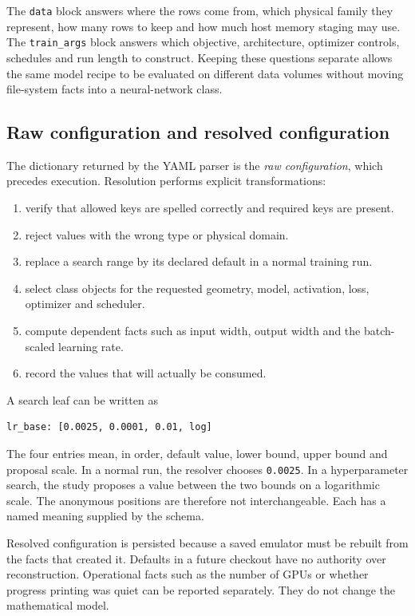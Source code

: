\documentclass[10pt,aps,prd,twocolumn,nofootinbib]{revtex4-2}
\newcommand{\code}[1]{\texttt{#1}}
\begin{document}
The \code{data} block answers where the rows come from, which physical family
they represent, how many rows to keep and how much host memory staging may
use.  The \code{train\_args} block answers which objective, architecture,
optimizer controls, schedules and run length to construct.  Keeping these
questions separate allows the same model recipe to be evaluated on different
data volumes without moving file-system facts into a neural-network class.

\subsection{Raw configuration and resolved configuration}

The dictionary returned by the YAML parser is the \emph{raw configuration},
which precedes execution.  Resolution performs explicit transformations:
\begin{enumerate}
  \item verify that allowed keys are spelled correctly and required keys are
        present.
  \item reject values with the wrong type or physical domain.
  \item replace a search range by its declared default in a normal training
        run.
  \item select class objects for the requested geometry, model, activation,
        loss, optimizer and scheduler.
  \item compute dependent facts such as input width, output width and the
        batch-scaled learning rate.
  \item record the values that will actually be consumed.
\end{enumerate}

A search leaf can be written as
\begin{verbatim}
lr_base: [0.0025, 0.0001, 0.01, log]
\end{verbatim}
The four entries mean, in order, default value, lower bound, upper bound and
proposal scale.  In a normal run, the resolver chooses \code{0.0025}.  In a
hyperparameter search, the study proposes a value between the two bounds on a
logarithmic scale.  The anonymous positions are therefore not interchangeable.
Each has a named meaning supplied by the schema.

Resolved configuration is persisted because a saved emulator must be rebuilt
from the facts that created it.  Defaults in a future checkout have no authority
over reconstruction.  Operational facts such as the number of GPUs or whether
progress printing was quiet can be reported separately.  They do not change
the mathematical model.
\end{document}
